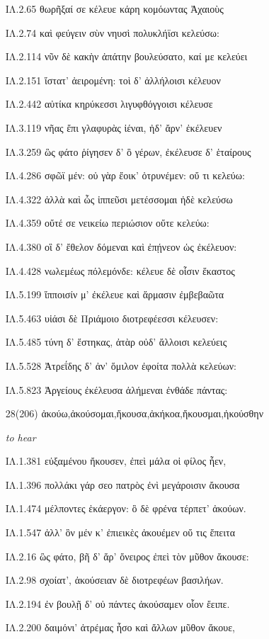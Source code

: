\begin{enumerate}
{ΙΛ.2.65 θωρῆξαί σε κέλευε κάρη κομόωντας Ἀχαιοὺς

ΙΛ.2.74 καὶ φεύγειν σὺν νηυσὶ πολυκλήϊσι κελεύσω:

ΙΛ.2.114 νῦν δὲ κακὴν ἀπάτην βουλεύσατο, καί με κελεύει

ΙΛ.2.151 ἵστατ' ἀειρομένη: τοὶ δ' ἀλλήλοισι κέλευον

ΙΛ.2.442 αὐτίκα κηρύκεσσι λιγυφθόγγοισι κέλευσε

ΙΛ.3.119 νῆας ἔπι γλαφυρὰς ἰέναι, ἠδ' ἄρν' ἐκέλευεν

ΙΛ.3.259 ὣς φάτο ῥίγησεν δ' ὃ γέρων, ἐκέλευσε δ' ἑταίρους

ΙΛ.4.286 σφῶϊ μέν: οὐ γὰρ ἔοικ' ὀτρυνέμεν: οὔ τι κελεύω:

ΙΛ.4.322 ἀλλὰ καὶ ὧς ἱππεῦσι μετέσσομαι ἠδὲ κελεύσω

ΙΛ.4.359 οὔτέ σε νεικείω περιώσιον οὔτε κελεύω:

ΙΛ.4.380 οἳ δ' ἔθελον δόμεναι καὶ ἐπῄνεον ὡς ἐκέλευον:

ΙΛ.4.428 νωλεμέως πόλεμόνδε: κέλευε δὲ οἷσιν ἕκαστος

ΙΛ.5.199 ἵπποισίν μ' ἐκέλευε καὶ ἅρμασιν ἐμβεβαῶτα

ΙΛ.5.463 υἱάσι δὲ Πριάμοιο διοτρεφέεσσι κέλευσεν:

ΙΛ.5.485 τύνη δ' ἕστηκας, ἀτὰρ οὐδ' ἄλλοισι κελεύεις

ΙΛ.5.528 Ἀτρεΐδης δ' ἀν' ὅμιλον ἐφοίτα πολλὰ κελεύων:

ΙΛ.5.823 Ἀργείους ἐκέλευσα ἀλήμεναι ἐνθάδε πάντας:
}


\clearpage
\item[\large 28(206)]{\large \g ἀκούω,ἀκούσομαι,ἤκουσα,ἀκήκοα,ἤκουσμαι,ἠκούσθην     }

\hspace{0.2cm} \textit{ to hear  }

{\g
ΙΛ.1.381 εὐξαμένου ἤκουσεν, ἐπεὶ μάλα οἱ φίλος ἦεν,

ΙΛ.1.396 πολλάκι γάρ σεο πατρὸς ἐνὶ μεγάροισιν ἄκουσα

ΙΛ.1.474 μέλποντες ἑκάεργον: ὃ δὲ φρένα τέρπετ' ἀκούων.

ΙΛ.1.547 ἀλλ' ὃν μέν κ' ἐπιεικὲς ἀκουέμεν οὔ τις ἔπειτα

ΙΛ.2.16 ὣς φάτο, βῆ δ' ἄρ' ὄνειρος ἐπεὶ τὸν μῦθον ἄκουσε:

ΙΛ.2.98 σχοίατ', ἀκούσειαν δὲ διοτρεφέων βασιλήων.

ΙΛ.2.194 ἐν βουλῇ δ' οὐ πάντες ἀκούσαμεν οἷον ἔειπε.

ΙΛ.2.200 δαιμόνι' ἀτρέμας ἧσο καὶ ἄλλων μῦθον ἄκουε,

}
\end{enumerate}
